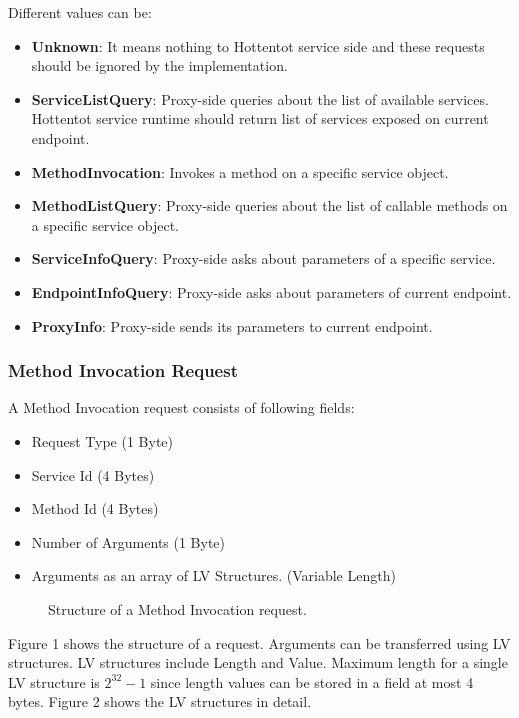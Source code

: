 \documentclass[10pt,a4paper]{article}
\begin{document}
\noindent
Different values can be:
\begin{itemize}
  \item \textbf{Unknown}: It means nothing to Hottentot service side and these requests should be ignored by the implementation.
  \item \textbf{ServiceListQuery}: Proxy-side queries about the list of available services. Hottentot service runtime should return list of services exposed on current endpoint.
  \item \textbf{MethodInvocation}: Invokes a method on a specific service object.
  \item \textbf{MethodListQuery}: Proxy-side queries about the list of callable methods on a specific service object.
  \item \textbf{ServiceInfoQuery}: Proxy-side asks about parameters of a specific service.
  \item \textbf{EndpointInfoQuery}: Proxy-side asks about parameters of current endpoint.
  \item \textbf{ProxyInfo}: Proxy-side sends its parameters to current endpoint.
\end{itemize}

\subsubsection {Method Invocation Request}
A Method Invocation request consists of following fields:
\begin{itemize}
  \item Request Type (1 Byte)
  \item Service Id (4 Bytes)
  \item Method Id (4 Bytes)
  \item Number of Arguments (1 Byte)
  \item Arguments as an array of LV Structures. (Variable Length)
\end{itemize}

\begin{figure}[!ht]
  \caption{Structure of a Method Invocation request.}
  \centering
\end{figure}

Figure 1 shows the structure of a request. Arguments can be transferred using LV structures. LV structures include Length and Value. Maximum length for a single LV structure is $2^{32} - 1$ since length values can be stored in a field at most 4 bytes. Figure 2 shows the LV structures in detail.
\end{document}
